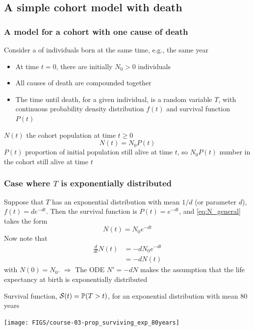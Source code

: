 \documentclass[aspectratio=169]{beamer}\usepackage[]{graphicx}\usepackage[]{xcolor}
\begin{document}
\subsection{A simple cohort model with death} 

\begin{frame}\frametitle{A model for a cohort with one cause of death}
Consider a  of individuals born at the same time, e.g., the same year
\vfill
\begin{itemize}
\item At time $t=0$, there are initially $N_0>0$ individuals
\item All causes of death are compounded together 
\item The time until death, for a given individual, is a random variable $T$, with continuous probability density distribution $f(t)$ and survival function $P(t)$
\end{itemize}
\vfill
$N(t)$ the cohort population at time $t\geq 0$
\begin{equation}\label{eq:N_general}
N(t)=N_0P(t)
\end{equation}
\vfill
$P(t)$ proportion of initial population still alive at time $t$, so $N_0P(t)$ number in the cohort still alive at time $t$
\end{frame}

\begin{frame}\frametitle{Case where $T$ is exponentially distributed}
Suppose that $T$ has an exponential distribution with mean $1/d$ (or parameter $d$), $f(t)=de^{-dt}$. Then the survival function is $P(t)=e^{-dt}$, and \eqref{eq:N_general} takes the form
\begin{equation}\label{eq:N}
N(t)=N_0e^{-dt}
\end{equation}
\vfill
Now note that
\begin{align*}
\frac{d}{dt} N(t) &= -dN_0e^{-dt} \\
&= -dN(t)
\end{align*}
with $N(0)=N_0$.
\vfill
{\red $\Rightarrow$} The ODE $N'=-dN$ makes the assumption that the life expectancy at birth is exponentially distributed
\end{frame}



\begin{frame}
Survival function, $\mathcal{S}(t)=\mathbb{P}(T>t)$, for an exponential distribution with mean 80 years
\begin{center}
\texttt{[image: FIGS/course-03-prop\_surviving\_exp\_80years]}
\end{center}
\end{frame}
\end{document}
